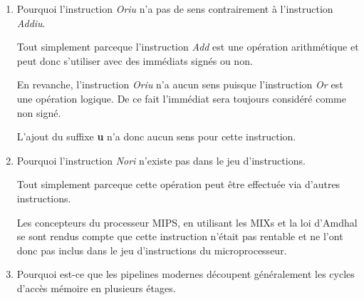 \begin{enumerate}
\begin{correction}
      Ainsi l'adresse suivante est calcul\'ee de la mani\`ere suivante:

      \begin{verbatim}
	instruction address = branchment instruction address + 4 +
                      immediate << 2
      \end{verbatim}

      ce qui est \'equivalent \`a:

      \begin{verbatim}
	instruction address = current instruction address + immediate << 2
      \end{verbatim}

    \end{correction}
  \item
    Pourquoi l'instruction \textit{Oriu} n'a pas de sens contrairement
    \`a l'instruction \textit{Addiu}.

    \begin{correction}

      Tout simplement parceque l'instruction \textit{Add} est une
      op\'eration arithm\'etique et peut donc s'utiliser avec des
      imm\'ediats sign\'es ou non.

      En revanche, l'instruction \textit{Oriu} n'a aucun sens puisque
      l'instruction \textit{Or} est une op\'eration logique. De ce fait
      l'imm\'ediat sera toujours consid\'er\'e comme non sign\'e.

      L'ajout du suffixe \textbf{u} n'a donc aucun sens pour cette instruction.

    \end{correction}
  \item
    Pourquoi l'instruction \textit{Nori} n'existe pas dans le jeu
    d'instructions.

    \begin{correction}

      Tout simplement parceque cette op\'eration peut \^etre effectu\'ee
      via d'autres instructions.

      Les concepteurs du processeur MIPS, en utilisant les MIXs et la
      loi d'Amdhal se sont rendus compte que cette instruction n'\'etait
      pas rentable et ne l'ont donc pas inclus dans le jeu d'instructions
      du microprocesseur.

    \end{correction}

  \item
    Pourquoi est-ce que les pipelines modernes d\'ecoupent g\'en\'eralement
    les cycles d'acc\`es m\'emoire en plusieurs \'etages.


\end{enumerate}
